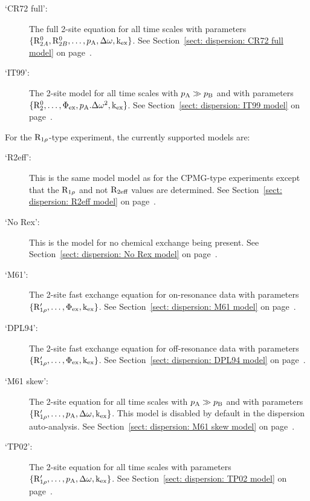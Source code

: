 \begin{description}
\item[`CR72 full':]  The full \citet{CarverRichards72} 2-site equation for all time scales with parameters $\{\mathrm{R}_{2A}^0, \mathrm{R}_{2B}^0, \dots, p_\textrm{A}, \Delta\omega, \textrm{k}_\textrm{ex}\}$.  See Section~\ref{sect: dispersion: CR72 full model} on page~\pageref{sect: dispersion: CR72 full model}.
\item[`IT99':]  The \citet{IshimaTorchia99} 2-site model for all time scales with $p_\textrm{A} \gg p_\textrm{B}$ and with parameters $\{\mathrm{R}_2^0, \dots, \Phi_\textrm{ex}, p_\textrm{A}.\Delta\omega^2, \textrm{k}_\textrm{ex}\}$.  See Section~\ref{sect: dispersion: IT99 model} on page~\pageref{sect: dispersion: IT99 model}.
\end{description}

For the $\mathrm{R}_{1\rho}$-type experiment, the currently supported models are:

\begin{description}
\item[`R2eff':]  This is the same model model as for the CPMG-type experiments except that the $\mathrm{R}_{1\rho}$ and not $\mathrm{R}_{2\textrm{eff}}$ values are determined.  See Section~\ref{sect: dispersion: R2eff model} on page~\pageref{sect: dispersion: R2eff model}.
\item[`No Rex':]  This is the model for no chemical exchange being present.  See Section~\ref{sect: dispersion: No Rex model} on page~\pageref{sect: dispersion: No Rex model}.
\item[`M61':]  The \citet{Meiboom61} 2-site fast exchange equation for on-resonance data with parameters $\{\mathrm{R}_{1\rho}', \dots, \Phi_\textrm{ex}, \textrm{k}_\textrm{ex}\}$.  See Section~\ref{sect: dispersion: M61 model} on page~\pageref{sect: dispersion: M61 model}.
\item[`DPL94':]  The \citet{Davis94} 2-site fast exchange equation for off-resonance data with parameters $\{\mathrm{R}_{1\rho}', \dots, \Phi_\textrm{ex}, \textrm{k}_\textrm{ex}\}$.  See Section~\ref{sect: dispersion: DPL94 model} on page~\pageref{sect: dispersion: DPL94 model}.
\item[`M61 skew':]  The \citet{Meiboom61} 2-site equation for all time scales with $p_\textrm{A} \gg p_\textrm{B}$ and with parameters $\{\mathrm{R}_{1\rho}', \dots, p_\textrm{A}, \Delta\omega, \textrm{k}_\textrm{ex}\}$.  This model is disabled by default in the dispersion auto-analysis.  See Section~\ref{sect: dispersion: M61 skew model} on page~\pageref{sect: dispersion: M61 skew model}.
\item[`TP02':]  The \citet{TrottPalmer02} 2-site equation for all time scales with parameters $\{\mathrm{R}_{1\rho}', \dots, p_\textrm{A}, \Delta\omega, \textrm{k}_\textrm{ex}\}$.  See Section~\ref{sect: dispersion: TP02 model} on page~\pageref{sect: dispersion: TP02 model}.
\end{description}


